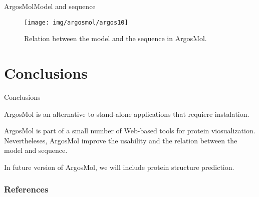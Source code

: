 \documentclass[10pt]{beamer}
\newcommand{\1}{
        	\setbeamertemplate{background}{
        		\texttt{[image: img/1]}
        		\tikz[overlay] \fill[fill opacity=0.75,fill=white] (0,0) rectangle (-\paperwidth,\paperheight);
        	}
}
\begin{document}
\begin{frame}{ArgosMol}{Model and sequence}	
	\begin{figure}
		\centering
		\texttt{[image: img/argosmol/argos10]}
		\caption{Relation between the model and the sequence in ArgosMol.}
	\end{figure}
\end{frame}

\section{Conclusions}
\begin{frame}{Conclusions}{}	

	\begin{block}{}
		ArgosMol is an alternative to stand-alone applications that requiere instalation.
	\end{block}

	\begin{block}{}
		ArgosMol is part of a small number of Web-based tools for protein viosualization. Nevertheleses, ArgosMol improve the usability and the relation between the model and sequence.
	\end{block}

	\begin{block}{}
		In future version of ArgosMol, we will include protein structure prediction.
	\end{block}

\end{frame}

\begin{frame}[allowframebreaks]
	\frametitle{References}
	
	
\end{frame}
\end{document}
